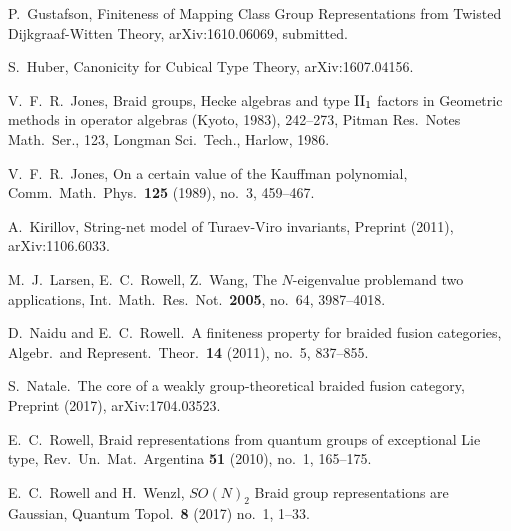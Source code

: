 \documentclass[12pt]{article}
\theoremstyle{plain} \numberwithin{equation}{section}
\theoremstyle{definition}
\begin{document}
\begin{thebibliography}{0}
          
 P.\ Gustafson, {Finiteness of Mapping Class Group Representations from Twisted Dijkgraaf-Witten Theory}, arXiv:1610.06069, submitted.

  S.\ Huber, Canonicity for Cubical Type Theory, arXiv:1607.04156.

   
 V.\ F.\ R.\ Jones, {Braid groups, Hecke algebras and type ${\rm II}\sb 1$ factors} in Geometric methods in operator algebras (Kyoto, 1983), 242--273, Pitman Res.\ Notes Math.\ Ser., 123, Longman Sci.\ Tech., Harlow, 1986.

 V.\ F.\ R.\ Jones, {On a certain value of the Kauffman polynomial}, Comm.\ Math.\ Phys.\ \textbf{125} (1989), no.\ 3, 459--467.

   A.\ Kirillov, {String-net model of {Turaev-Viro} invariants}, Preprint (2011), arXiv:1106.6033.
  
 M.\ J.\ Larsen, E.\ C.\ Rowell, Z.\ Wang, {The $N$-eigenvalue problemand two applications}, Int.\ Math.\ Res.\ Not.\  \textbf{2005},  no.\ 64, 3987--4018. 
    
 D.\ Naidu and E.\ C.\ Rowell.\ A finiteness property for braided fusion categories, Algebr.\ and Represent.\ Theor.\ \textbf{14} (2011), no.\ 5, 837--855.

 S.\ Natale.\ The core of a weakly group-theoretical braided fusion category, Preprint (2017), arXiv:1704.03523.

  E.\ C.\ Rowell, Braid representations from quantum groups of exceptional Lie type, Rev.\ Un.\ Mat.\ Argentina \textbf{51} (2010), no.\ 1, 165--175.

    E.\ C.\ Rowell and H.\ Wenzl, $SO(N)_2$ Braid group representations are Gaussian, Quantum Topol.\ \textbf{8} (2017) no.\ 1, 1--33.
    
\end{thebibliography}
\end{document}
